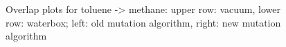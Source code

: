 \begin{figure}[h]
	\hfil
	
	\caption{Overlap plots for toluene -> methane: upper row: vacuum, lower row: waterbox; left: old mutation algorithm, right: new mutation algorithm}
	\label{fig:toluene_overlaps}
\end{figure}


